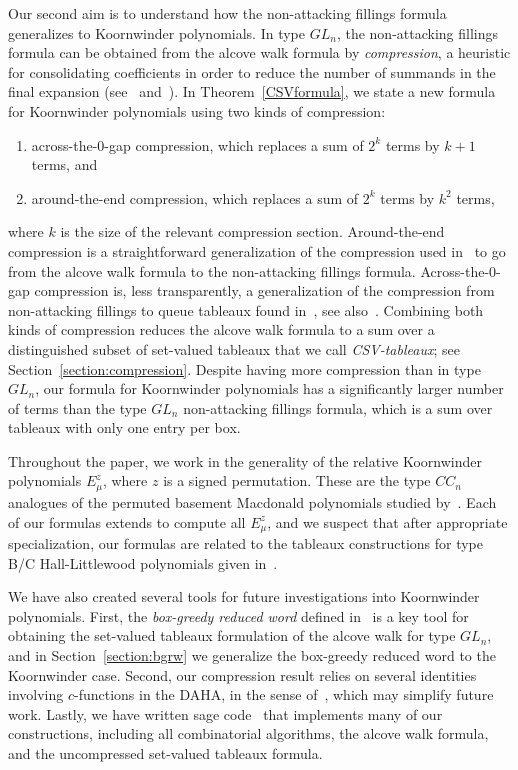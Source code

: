 \documentclass[11pt]{article}
\theoremstyle{plain}
\theoremstyle{definition}
\theoremstyle{remark}
\numberwithin{equation}{section}
\newcounter{r}
\newcounter{s}
\begin{document}
Our second aim is to understand how the non-attacking fillings formula generalizes to Koornwinder polynomials.  
In type $GL_n$, the non-attacking fillings formula can be obtained from the alcove walk formula by \emph{compression}, a heuristic for consolidating coefficients in order to reduce the number of summands in the final expansion (see~\cite{Len08} and~\cite{GR21}).  
In Theorem~\ref{CSVformula}, we state a new formula for Koornwinder polynomials using two kinds of compression:
\begin{enumerate}
\item[(a)] across-the-$0$-gap compression, which replaces a sum of $2^{k}$ terms by $k+1$ terms, and
\item[(b)] around-the-end compression, which replaces a sum of $2^{k}$ terms by $k^2$ terms,
\end{enumerate}
where $k$ is the size of the relevant compression section.
Around-the-end compression is a straightforward generalization of the compression used in~\cite[\S1.2]{GR21} to go from the alcove walk formula to the non-attacking fillings formula.  
Across-the-$0$-gap compression is, less transparently, a generalization of the compression from non-attacking fillings to queue tableaux found in~\cite[Appendix A]{CMW18}, see also~\cite{CdGW15}.  
Combining both kinds of compression reduces the alcove walk formula to a sum over a distinguished subset of set-valued tableaux that we call \emph{CSV-tableaux}; see Section~\ref{section:compression}.  
Despite having more compression than in type $GL_n$, our formula for Koornwinder polynomials has a significantly larger number of terms than the type $GL_n$ non-attacking fillings formula, which is a sum over tableaux with only one entry per box.  

Throughout the paper, we work in the generality of the relative Koornwinder polynomials $E^z_\mu$, where $z$ is a signed permutation.  
These are the type $CC_{n}$ analogues of the permuted basement Macdonald polynomials studied by~\cite{Al16}.  
Each of our formulas extends to compute all $E^z_\mu$, and we suspect that after appropriate specialization, our formulas are related to the tableaux constructions for type B/C Hall-Littlewood polynomials
given in~\cite{Len10}.

We have also created several tools for future investigations into Koornwinder polynomials.  
First, the \emph{box-greedy reduced word} defined in~\cite{GR21} is a key tool for obtaining the set-valued tableaux formulation of the alcove walk for type $GL_n$, and in Section~\ref{section:bgrw} we generalize the box-greedy reduced word to the Koornwinder case.  
Second, our compression result relies on several identities involving $c$-functions in the DAHA, in the sense of~\cite{CR24}, which may simplify future work.  
Lastly, we have written {\color{purple}sage code~\cite{GagnonGitHub}} that implements many of our constructions, including all combinatorial algorithms, the alcove walk formula, and the uncompressed set-valued tableaux formula.  
\end{document}
